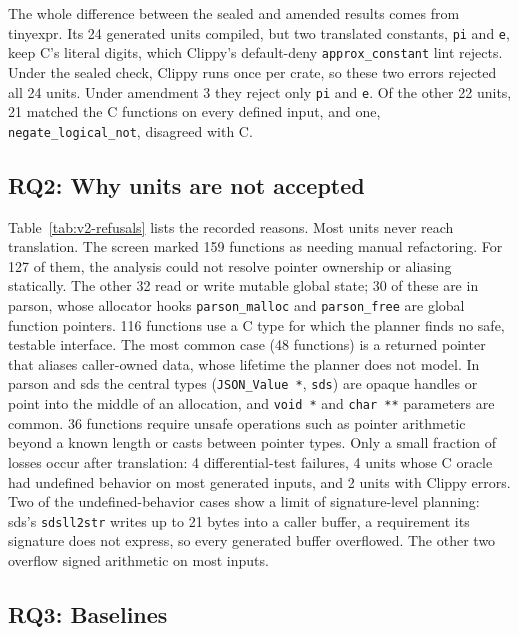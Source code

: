 \documentclass[pdflatex,sn-basic]{sn-jnl}
\begin{document}


The whole difference between the sealed and amended results comes from
tinyexpr. Its 24 generated units compiled, but two translated constants,
\texttt{pi} and \texttt{e}, keep C's literal digits, which Clippy's
default-deny \texttt{approx\_constant} lint rejects. Under the sealed check,
Clippy runs once per crate, so these two errors rejected all 24 units. Under
amendment 3 they reject only \texttt{pi} and \texttt{e}. Of the other 22
units, 21 matched the C functions on every defined input, and one,
\texttt{negate\_logical\_not}, disagreed with C.

\subsection{RQ2: Why units are not accepted}

Table~\ref{tab:v2-refusals} lists the recorded reasons. Most units never
reach translation. The screen marked 159 functions as needing manual
refactoring. For 127 of them, the analysis could not resolve pointer
ownership or aliasing statically. The other 32 read or write mutable global
state; 30 of these are in parson, whose allocator hooks
\texttt{parson\_malloc} and \texttt{parson\_free} are global function
pointers. 116 functions use a C type for which the planner finds no safe,
testable interface. The most common case (48 functions) is a returned pointer
that aliases caller-owned data, whose lifetime the planner does not model. In
parson and sds the central types (\texttt{JSON\_Value *}, \texttt{sds}) are
opaque handles or point into the middle of an allocation, and \texttt{void *}
and \texttt{char **} parameters are common. 36 functions require unsafe
operations such as pointer arithmetic beyond a known length or casts between
pointer types. Only a small fraction of losses occur after translation: 4
differential-test failures, 4 units whose C oracle had undefined behavior on
most generated inputs, and 2 units with Clippy errors. Two of the undefined-behavior cases show a
limit of signature-level planning: sds's \texttt{sdsll2str} writes up to 21
bytes into a caller buffer, a requirement its signature does not express, so
every generated buffer overflowed. The other two overflow signed arithmetic on
most inputs.



\subsection{RQ3: Baselines}
\end{document}
